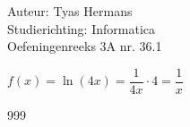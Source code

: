 \documentclass[a4paper]{article}
\begin{document}
  
\noindent \large Auteur: Tyas Hermans \\
\noindent \large Studierichting: Informatica\\
\noindent \large Oefeningenreeks 3A nr. 36.1 \\

\medskip

\normalsize

$f(x) = \ln(4x) = \dfrac{1}{4x} \cdot 4 = \dfrac{1}{x}$\\



\begin{thebibliography}{999}
\end{thebibliography}
\end{document}
